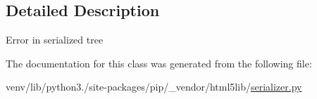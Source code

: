 \subsection{Detailed Description}
\begin{DoxyVerb}Error in serialized tree\end{DoxyVerb}
 

The documentation for this class was generated from the following file\+:\begin{DoxyCompactItemize}
\item 
venv/lib/python3./site-\/packages/pip/\+\_\+vendor/html5lib/\hyperlink{serializer_8py}{serializer.\+py}\end{DoxyCompactItemize}
